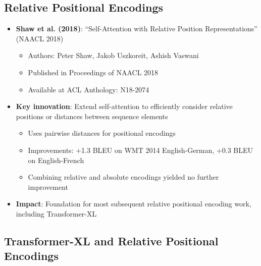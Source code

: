 \documentclass[11pt,letterpaper]{article}
\begin{document}
\subsection{Relative Positional Encodings}

\begin{itemize}[leftmargin=*]
    \item \textbf{Shaw et al. (2018)}: ``Self-Attention with Relative Position Representations'' (NAACL 2018)
    \begin{itemize}
        \item Authors: Peter Shaw, Jakob Uszkoreit, Ashish Vaswani
        \item Published in Proceedings of NAACL 2018
        \item Available at ACL Anthology: N18-2074
    \end{itemize}

    \item \textbf{Key innovation}: Extend self-attention to efficiently consider relative positions or distances between sequence elements
    \begin{itemize}
        \item Uses pairwise distances for positional encodings
        \item Improvements: +1.3 BLEU on WMT 2014 English-German, +0.3 BLEU on English-French
        \item Combining relative and absolute encodings yielded no further improvement
    \end{itemize}

    \item \textbf{Impact}: Foundation for most subsequent relative positional encoding work, including Transformer-XL
\end{itemize}

\subsection{Transformer-XL and Relative Positional Encodings}
\end{document}
